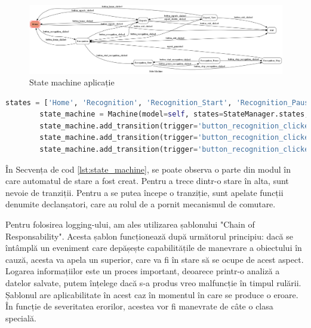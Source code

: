 \documentclass[a4paper, 12pt]{report}
\begin{document}
	\begin{figure}[H]
		\begin{center}
			\includegraphics[scale=0.2]{images/state_diagram.png}
		\end{center}
		\caption{State machine aplicație}
		\label{fig:state}
	\end{figure} 	

	\begin{lstlisting}[language=python, caption=Snip creare state machine, label=lst:state_machine]
		states = ['Home', 'Recognition', 'Recognition_Start', 'Recognition_Pause', 'Recognition_Stop', 'Reports', 'Report_View', 'Exit']
		state_machine = Machine(model=self, states=StateManager.states, initial='Home')
		state_machine.add_transition(trigger='button_recognition_clicked', source='Home', dest='Recognition', before="change_frame")
		state_machine.add_transition(trigger='button_recognition_clicked', source='Reports', dest='Recognition', before="change_frame")
		state_machine.add_transition(trigger='button_recognition_clicked', source='Report_View', dest='Recognition', before="change_frame")
	\end{lstlisting}
	
	În Secvența de cod \ref{lst:state_machine}, se poate observa o parte din modul în care automatul de stare a fost creat. Pentru a trece dintr-o stare în alta, sunt nevoie de tranziții. Pentru a se putea începe o tranziție, sunt apelate funcții denumite declanșatori, care au rolul de a pornit mecanismul de comutare.
	
	Pentru folosirea logging-ului, am ales utilizarea șablonului "Chain of Responsability". Acesta șablon funcționează după următorul principiu: dacă se întâmplă un eveniment care depășește capabilitățile de manevrare a obiectului în cauză, acesta va apela un superior, care va fi în stare să se ocupe de acest aspect. Logarea informațiilor este un proces important, deoarece printr-o analiză a datelor salvate, putem înțelege dacă s-a produs vreo malfuncție în timpul rulării. Șablonul are aplicabilitate în acest caz în momentul în care se produce o eroare. În funcție de severitatea erorilor, acestea vor fi manevrate de câte o clasa specială. 
	
\end{document}
